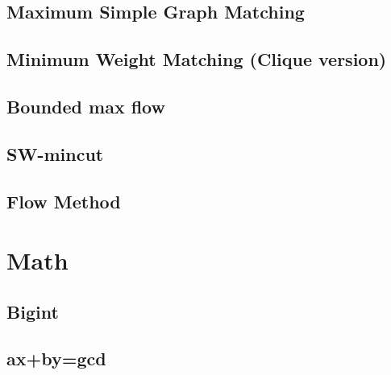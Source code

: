 \documentclass[a4paper,10pt,twocolumn,oneside]{article}
\begin{document}
\subsection{Maximum Simple Graph Matching}


\subsection{Minimum Weight Matching (Clique version)}


% 

\subsection{Bounded max flow}


%

\subsection{SW-mincut}


\subsection{Flow Method}


\section{Math}

\subsection{Bigint}


\subsection{ax+by=gcd}

\end{document}
